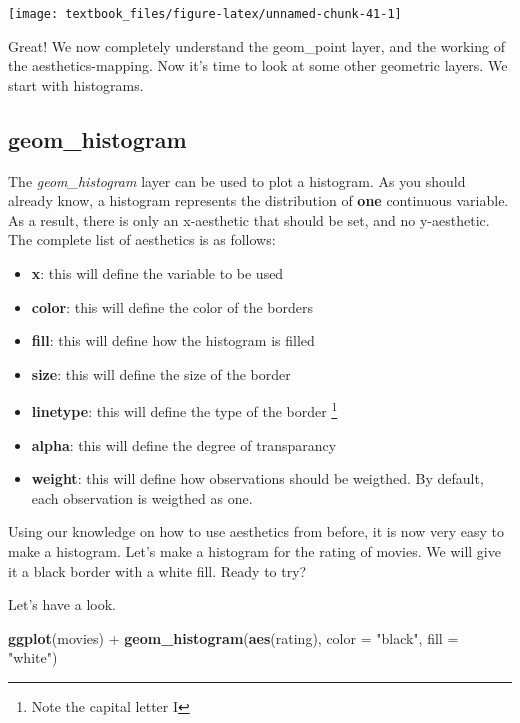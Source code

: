 \documentclass[]{tufte-book}
\newenvironment{Shaded}{}{}
\newcommand{\DataTypeTok}[1]{\textcolor[rgb]{0.56,0.13,0.00}{#1}}
\newcommand{\KeywordTok}[1]{\textcolor[rgb]{0.00,0.44,0.13}{\textbf{#1}}}
\newcommand{\NormalTok}[1]{#1}
\newcommand{\OperatorTok}[1]{\textcolor[rgb]{0.40,0.40,0.40}{#1}}
\newcommand{\StringTok}[1]{\textcolor[rgb]{0.25,0.44,0.63}{#1}}
\providecommand{\tightlist}{%
  \setlength{\itemsep}{0pt}\setlength{\parskip}{0pt}}
\begin{document}
\texttt{[image: textbook\_files/figure-latex/unnamed-chunk-41-1]}

Great! We now completely understand the geom\_point layer, and the working of the aesthetics-mapping. Now it's time to look at some other geometric layers. We start with histograms.

\hypertarget{geom_histogram}{%
\subsection{geom\_histogram}\label{geom_histogram}}

The \emph{geom\_histogram} layer can be used to plot a histogram. As you should already know, a histogram represents the distribution of \textbf{one} continuous variable. As a result, there is only an x-aesthetic that should be set, and no y-aesthetic. The complete list of aesthetics is as follows:

\begin{itemize}
\tightlist
\item
  \textbf{x}: this will define the variable to be used
\item
  \textbf{color}: this will define the color of the borders
\item
  \textbf{fill}: this will define how the histogram is filled
\item
  \textbf{size}: this will define the size of the border
\item
  \textbf{linetype}: this will define the type of the border \footnote{Note the capital letter I}
\item
  \textbf{alpha}: this will define the degree of transparancy
\item
  \textbf{weight}: this will define how observations should be weigthed. By default, each observation is weigthed as one.
\end{itemize}

Using our knowledge on how to use aesthetics from before, it is now very easy to make a histogram. Let's make a histogram for the rating of movies. We will give it a black border with a white fill. Ready to try?

Let's have a look.

\begin{Shaded}
\begin{Highlighting}[]
\KeywordTok{ggplot}\NormalTok{(movies) }\OperatorTok{+}
\StringTok{    }\KeywordTok{geom_histogram}\NormalTok{(}\KeywordTok{aes}\NormalTok{(rating), }\DataTypeTok{color =} \StringTok{"black"}\NormalTok{, }\DataTypeTok{fill =} \StringTok{"white"}\NormalTok{)}
\end{Highlighting}
\end{Shaded}
\end{document}
